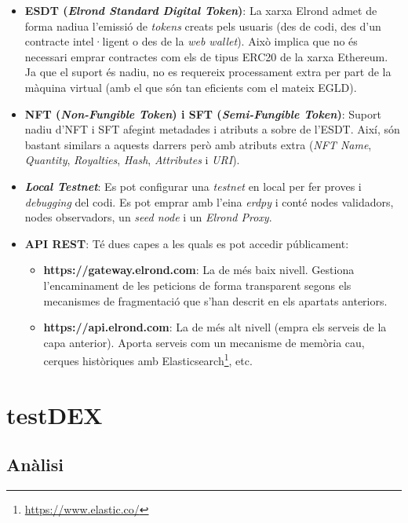 \documentclass[11pt,a4paper]{article}
\begin{document}
\begin{itemize}
\item \textbf{ESDT (\textit{Elrond Standard Digital Token})}: La xarxa Elrond admet de forma nadiua l'emissió de \textit{tokens} creats pels usuaris (des de codi, des d'un contracte intel·ligent o des de la \textit{web wallet}). Això implica que no és necessari emprar contractes com els de tipus ERC20 de la xarxa Ethereum. Ja que el suport és nadiu, no es requereix processament extra per part de la màquina virtual (amb el que són tan eficients com el mateix EGLD).

\item \textbf{NFT (\textit{Non-Fungible Token}) i SFT (\textit{Semi-Fungible Token})}: Suport nadiu d'NFT i SFT afegint metadades i atributs a sobre de l'ESDT. Així, són bastant similars a aquests darrers però amb atributs extra (\textit{NFT Name}, \textit{Quantity}, \textit{Royalties}, \textit{Hash}, \textit{Attributes} i \textit{URI}).

\item \textbf{\textit{Local Testnet}}: Es pot configurar una \textit{testnet} en local per fer proves i \textit{debugging} del codi. Es pot emprar amb l'eina \textit{erdpy} i conté nodes validadors, nodes observadors, un \textit{seed node} i un \textit{Elrond Proxy}.

\item  \textbf{API REST}: Té dues capes a les quals es pot accedir públicament:
\begin{itemize}
\item \textbf{https://gateway.elrond.com}: La de més baix nivell. Gestiona l'encaminament de les peticions de forma transparent segons els mecanismes de fragmentació que s'han descrit en els apartats anteriors.
\item \textbf{https://api.elrond.com}:  La de més alt nivell (empra els serveis de la capa anterior). Aporta serveis com un mecanisme de memòria cau, cerques històriques amb Elasticsearch\footnote{\url{https://www.elastic.co/}}, etc.
\end{itemize}
\end{itemize}

\clearpage

\section{testDEX}\label{sec:testdex}

\subsection{Anàlisi}
\end{document}
